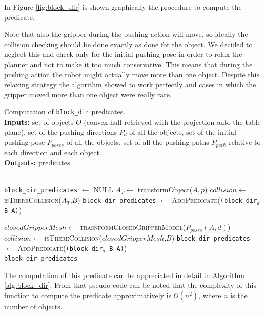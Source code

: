 In Figure \ref{fig:block_dir} is shown graphically the procedure to compute the predicate. 


Note that also the gripper during the pushing action will move, so ideally the collision checking should be done exactly as done for the object. We decided to neglect this and check only for the initial pushing pose in order to relax the planner and not to make it too much conservative. This means that during the pushing action the robot might actually move more than one object. Despite this relaxing strategy the algorithm showed to work perfectly and cases in which the gripper moved more than one object were really rare.

\begin{algorithm}[h]
\caption{Computation of \texttt{block\_dir} predicates. \\
\textbf{Inputs:} set of objects $O$ (convex hull retrieved with the projection onto the table plane), set of the pushing directions $P_d$ of all the objects, set of the initial pushing pose $P_{poses}$ of all the objects, set of all the pushing paths $P_{path}$ relative to each direction and each object. \\
\textbf{Outputs:}  predicates}\label{alg:block_dir}
\begin{algorithmic}
\\
\texttt{block\_dir\_predicates} $\gets$ \textsc{NULL}
  \State $A_T \gets$ {\sc transformObject($A,p$)}
	\State $collision \gets$ \textsc{isThereCollision($A_T$,$B$)}
		\State \texttt{block\_dir\_predicates} $\gets$ \textsc{AddPredicate}(\texttt{(block\_dir$_d$ B A)})
	\EndIf
  \EndIf
  \EndFor 
  \EndFor

  \State $closedGripperMesh \gets$ \textsc{trasnformClosedGripperModel}($P_{poses}(A,d)$)
	\State $collision \gets$ \textsc{isThereCollision($closedGripperMesh$,$B$)}
		\State \texttt{block\_dir\_predicates} $\gets$ \textsc{AddPredicate}(\texttt{(block\_dir$_d$ B A)})
	\EndIf
  \EndIf
  \EndFor
\EndFor 
\EndFor \\
\Return  \texttt{block\_dir\_predicates}
\EndFunction
\end{algorithmic}
\end{algorithm}  
The computation of this predicate can be appreciated in detail in Algorithm \ref{alg:block_dir}. From that pseudo code can be noted that the complexity of this function to compute the predicate approximatively is %
$\mathcal{O}(n^2)$, where $n$ is the number of objects. 

